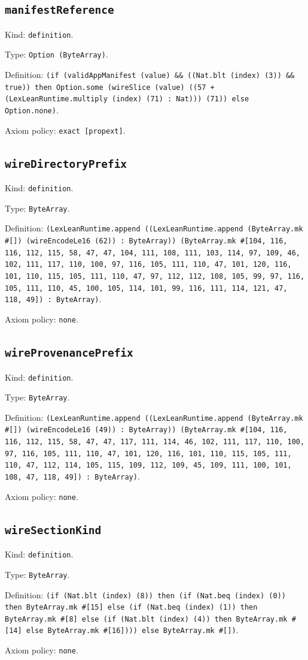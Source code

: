 \documentclass[11pt]{article}
\begin{document}
\subsection*{\texttt{manifestReference}}
\noindent Kind: \texttt{definition}.\par
\noindent Type: \texttt{Option (ByteArray)}.\par
\noindent Definition: \texttt{(if (validAppManifest (value) \&\& ((Nat.blt (index) (3)) \&\& true)) then Option.some (wireSlice (value) ((57 + (LexLeanRuntime.multiply (index) (71) : Nat))) (71)) else Option.none)}.\par
\noindent Axiom policy: \texttt{exact [propext]}.\par
\subsection*{\texttt{wireDirectoryPrefix}}
\noindent Kind: \texttt{definition}.\par
\noindent Type: \texttt{ByteArray}.\par
\noindent Definition: \texttt{(LexLeanRuntime.append ((LexLeanRuntime.append (ByteArray.mk \#[]) (wireEncodeLe16 (62)) : ByteArray)) (ByteArray.mk \#[104, 116, 116, 112, 115, 58, 47, 47, 104, 111, 108, 111, 103, 114, 97, 109, 46, 102, 111, 117, 110, 100, 97, 116, 105, 111, 110, 47, 101, 120, 116, 101, 110, 115, 105, 111, 110, 47, 97, 112, 112, 108, 105, 99, 97, 116, 105, 111, 110, 45, 100, 105, 114, 101, 99, 116, 111, 114, 121, 47, 118, 49]) : ByteArray)}.\par
\noindent Axiom policy: \texttt{none}.\par
\subsection*{\texttt{wireProvenancePrefix}}
\noindent Kind: \texttt{definition}.\par
\noindent Type: \texttt{ByteArray}.\par
\noindent Definition: \texttt{(LexLeanRuntime.append ((LexLeanRuntime.append (ByteArray.mk \#[]) (wireEncodeLe16 (49)) : ByteArray)) (ByteArray.mk \#[104, 116, 116, 112, 115, 58, 47, 47, 117, 111, 114, 46, 102, 111, 117, 110, 100, 97, 116, 105, 111, 110, 47, 101, 120, 116, 101, 110, 115, 105, 111, 110, 47, 112, 114, 105, 115, 109, 112, 109, 45, 109, 111, 100, 101, 108, 47, 118, 49]) : ByteArray)}.\par
\noindent Axiom policy: \texttt{none}.\par
\subsection*{\texttt{wireSectionKind}}
\noindent Kind: \texttt{definition}.\par
\noindent Type: \texttt{ByteArray}.\par
\noindent Definition: \texttt{(if (Nat.blt (index) (8)) then (if (Nat.beq (index) (0)) then ByteArray.mk \#[15] else (if (Nat.beq (index) (1)) then ByteArray.mk \#[8] else (if (Nat.blt (index) (4)) then ByteArray.mk \#[14] else ByteArray.mk \#[16]))) else ByteArray.mk \#[])}.\par
\noindent Axiom policy: \texttt{none}.\par
\end{document}

